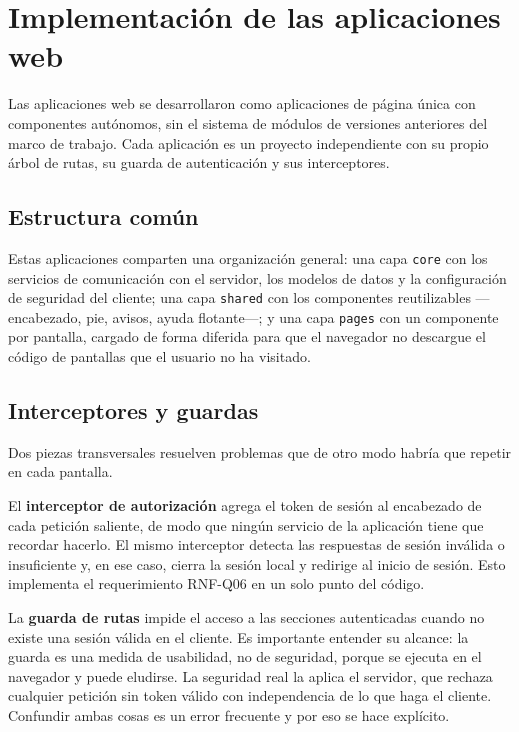 \normalsize
\setlength{\tabcolsep}{6pt}
\renewcommand{\arraystretch}{1}

\section{Implementación de las aplicaciones web}
\label{sec:impl_frontend}
Las aplicaciones web se desarrollaron como aplicaciones de página única con componentes
autónomos, sin el sistema de módulos de versiones anteriores del marco de trabajo. Cada
aplicación es un proyecto independiente con su propio árbol de rutas, su guarda de
autenticación y sus interceptores.

\subsection{Estructura común}
Estas aplicaciones comparten una organización general: una capa \texttt{core} con los servicios de
comunicación con el servidor, los modelos de datos y la configuración de seguridad del cliente;
una capa \texttt{shared} con los componentes reutilizables ---encabezado, pie, avisos, ayuda
flotante---; y una capa \texttt{pages} con un componente por pantalla, cargado de forma diferida
para que el navegador no descargue el código de pantallas que el usuario no ha visitado.

\subsection{Interceptores y guardas}
Dos piezas transversales resuelven problemas que de otro modo habría que repetir en cada
pantalla.

El \textbf{interceptor de autorización} agrega el token de sesión al encabezado de cada petición
saliente, de modo que ningún servicio de la aplicación tiene que recordar hacerlo. El mismo
interceptor detecta las respuestas de sesión inválida o insuficiente y, en ese caso, cierra la
sesión local y redirige al inicio de sesión. Esto implementa el requerimiento RNF-Q06 en un solo
punto del código.

La \textbf{guarda de rutas} impide el acceso a las secciones autenticadas cuando no existe una
sesión válida en el cliente. Es importante entender su alcance: la guarda es una medida de
usabilidad, no de seguridad, porque se ejecuta en el navegador y puede eludirse. La seguridad
real la aplica el servidor, que rechaza cualquier petición sin token válido con independencia de
lo que haga el cliente. Confundir ambas cosas es un error frecuente y por eso se hace explícito.

